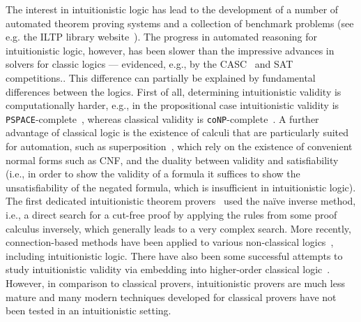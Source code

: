 \documentclass{article}
\theoremstyle{definition}
\theoremstyle{definition}
\theoremstyle{definition}
\theoremstyle{definition}
\theoremstyle{definition}
\theoremstyle{definition}
\theoremstyle{definition}
\newcommand{\0}{\mathbf 0}
\newcommand{\1}{\mathbf 1}
\begin{document}
	The interest in intuitionistic logic has lead to the development of a number of automated theorem proving systems and a collection of benchmark problems (see e.g. the ILTP library website~\cite{iltp}).
	The progress in automated reasoning for intuitionistic logic, however, has been slower than the  impressive advances in solvers for classic logics --- evidenced, e.g., by the CASC~\cite{casc} and SAT~\cite{satc} competitions..
	This difference can partially be explained by fundamental differences between the logics.
	First of all, determining intuitionistic validity is computationally harder, e.g., in the propositional case intuitionistic validity is \verb+PSPACE+-complete~\cite{statman1979intuitionistic}, whereas classical validity is \verb+coNP+-complete~\cite{cook1971complexity}.
	A further advantage of classical logic is the existence of calculi that are particularly suited for automation, such as superposition~\cite{bachmair2001resolution}, which rely on the existence of convenient normal forms such as CNF, and the duality between validity and satisfiability (i.e., in order to show the validity of a formula it suffices to show the unsatisfiability of the negated formula, which is insufficient in intuitionistic logic).
	The first dedicated intuitionistic theorem provers~\cite{mclaughlin2009efficient,tammet1996resolution} used the naïve inverse method, i.e., a direct search for a cut-free proof by applying the rules from some proof calculus inversely, which generally leads to a very complex search.
	More recently, connection-based methods have been applied to various non-classical logics~\cite{otten2005clausal,otten2021nanocop}, including intuitionistic logic.
	There have also been some successful attempts to study intuitionistic validity via embedding into higher-order classical logic~\cite{LEO}.
	However, in comparison to classical provers, intuitionistic provers are much less mature and many modern techniques developed for classical provers have not been tested in an intuitionistic setting.
\end{document}
